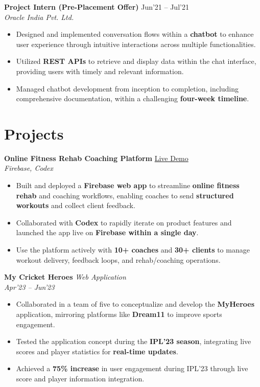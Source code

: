 \documentclass[10pt,a4paper]{article}
\newcommand{\resumeItem}[1]{\item[\textcolor{primary}{\textbullet}] #1}
\begin{document}
\vspace{1pt}
\textbf{Project Intern (Pre-Placement Offer)} \hfill Jun'21 -- Jul'21\\
\textit{Oracle India Pvt. Ltd.}
\begin{itemize}[leftmargin=1.05em, nosep, topsep=0pt, itemsep=0pt, parsep=0pt]
    \resumeItem{Designed and implemented conversation flows within a \textbf{chatbot} to enhance user experience through intuitive interactions across multiple functionalities.}
    \resumeItem{Utilized \textbf{REST APIs} to retrieve and display data within the chat interface, providing users with timely and relevant information.}
    \resumeItem{Managed chatbot development from inception to completion, including comprehensive documentation, within a challenging \textbf{four-week timeline}.}
\end{itemize}

\section{Projects}
\small

\textbf{Online Fitness Rehab Coaching Platform} \hfill \href{https://workout-planner-app-e7087.firebaseapp.com/}{Live Demo}\\
\textit{Firebase, Codex}
\begin{itemize}[leftmargin=1.05em, nosep, topsep=0pt, itemsep=0pt, parsep=0pt]
    \resumeItem{Built and deployed a \textbf{Firebase web app} to streamline \textbf{online fitness rehab} and coaching workflows, enabling coaches to send \textbf{structured workouts} and collect client feedback.}
    \resumeItem{Collaborated with \textbf{Codex} to rapidly iterate on product features and launched the app live on \textbf{Firebase within a single day}.}
    \resumeItem{Use the platform actively with \textbf{10+ coaches} and \textbf{30+ clients} to manage workout delivery, feedback loops, and rehab/coaching operations.}
\end{itemize}

\vspace{1pt}
\textbf{My Cricket Heroes} \hfill \textit{Web Application}\\
\textit{Apr'23 -- Jun'23}
\begin{itemize}[leftmargin=1.05em, nosep, topsep=0pt, itemsep=0pt, parsep=0pt]
    \resumeItem{Collaborated in a team of five to conceptualize and develop the \textbf{MyHeroes} application, mirroring platforms like \textbf{Dream11} to improve sports engagement.}
    \resumeItem{Tested the application concept during the \textbf{IPL'23 season}, integrating live scores and player statistics for \textbf{real-time updates}.}
    \resumeItem{Achieved a \textbf{75\% increase} in user engagement during IPL'23 through live score and player information integration.}
\end{itemize}
\end{document}
